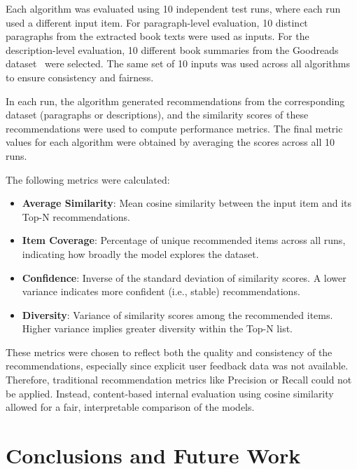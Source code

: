\documentclass[conference]{IEEEtran}
\begin{document}
Each algorithm was evaluated using 10 independent test runs, where each run used a different input item. For paragraph-level evaluation, 10 distinct paragraphs from the extracted book texts were used as inputs. For the description-level evaluation, 10 different book summaries from the Goodreads dataset~%
were selected. The same set of 10 inputs was used across all algorithms to ensure consistency and fairness.

In each run, the algorithm generated recommendations from the corresponding dataset (paragraphs or descriptions), and the similarity scores of these recommendations were used to compute performance metrics. The final metric values for each algorithm were obtained by averaging the scores across all 10 runs.

The following metrics were calculated:
\begin{itemize}
    \item \textbf{Average Similarity}: Mean cosine similarity between the input item and its Top-N recommendations.
    \item \textbf{Item Coverage}: Percentage of unique recommended items across all runs, indicating how broadly the model explores the dataset.
    \item \textbf{Confidence}: Inverse of the standard deviation of similarity scores. A lower variance indicates more confident (i.e., stable) recommendations.
    \item \textbf{Diversity}: Variance of similarity scores among the recommended items. Higher variance implies greater diversity within the Top-N list.
\end{itemize}

These metrics were chosen to reflect both the quality and consistency of the recommendations, especially since explicit user feedback data was not available. Therefore, traditional recommendation metrics like Precision or Recall could not be applied. Instead, content-based internal evaluation using cosine similarity allowed for a fair, interpretable comparison of the models.












\section{Conclusions and Future Work}
\end{document}
